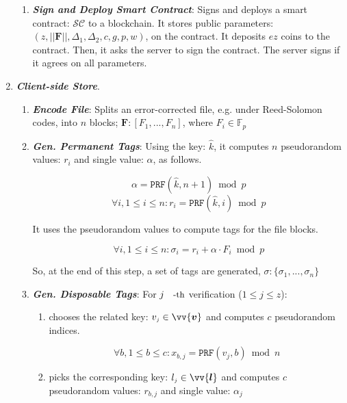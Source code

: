 \begin{enumerate}[leftmargin=.46cm]
\begin{enumerate}
\item\textbf{\textit{\small {Sign and Deploy   Smart Contract}}}: Signs and deploys a smart contract: $\mathcal{SC}$ to a blockchain.  It stores  public parameters: $(z,||{\bm{F}}||, \Delta_{\scriptscriptstyle 1},\Delta_{\scriptscriptstyle 2},c, g,p,w)$, on the contract. It deposits $e z$ coins to the contract. Then, it asks the server to sign the contract. The server signs if it agrees on all parameters.

\end{enumerate}
\item\textit{\textbf{Client-side Store}}.


\begin{enumerate}

\item \textbf{\textit{\small {Encode File}}}: Splits an error-corrected file, e.g. under Reed-Solomon codes, into $n$ blocks; ${\bm{F}}: [F_{\scriptscriptstyle 1},...,F_{\scriptscriptstyle n}]$,  where $ F_{\scriptscriptstyle i}\in \mathbb{F}_p$
\item\label{gen-client-server-tags}\textbf{\textit{\small {Gen. Permanent Tags}}}:  Using the key: $\hat{k}$, it computes $n$ pseudorandom values:  $r_{\scriptscriptstyle i}$ and single value: $\alpha$, as follows.  

 $$\alpha=\mathtt{PRF}(\hat{k},n+1)\bmod p$$
 $$ \forall i, 1\leq i\leq n: r_{\scriptscriptstyle i}=\mathtt{PRF}(\hat{k},i)\bmod p$$

 
 It uses the pseudorandom values to compute tags for the file blocks. 
 
 $$\forall i, 1\leq i\leq n: \sigma_{\scriptscriptstyle i}= r_{\scriptscriptstyle i}+ \alpha\cdot F_{\scriptscriptstyle  i}\bmod p$$
 
  So, at the end of this step,  a set of  tags are generated, $\sigma:\{\sigma_{\scriptscriptstyle 1},..., \sigma_{\scriptscriptstyle n}\}$
\item\label{Gen-Disposable-Tags}\textbf{\textit{\small {Gen. Disposable Tags}}}: For   $j\text{\small{-th}}$ verification  ($1\leq j\leq z$):
\begin{enumerate}
\item chooses the related key: $v_{\scriptscriptstyle j}\in\vv{\bm{v}}$ and computes $c$ pseudorandom indices. 

$$\forall b, 1\leq b\leq c: x_{\scriptscriptstyle b,j}=\mathtt{PRF}(v_{\scriptscriptstyle j}, b)\bmod n$$

\item picks the corresponding  key: $l_{\scriptscriptstyle j}\in \vv{\bm{l}}$ and computes $c$ pseudorandom values:  $r_{\scriptscriptstyle b,j}$ and single value: $\alpha_{\scriptscriptstyle j}$


\end{enumerate}
\end{enumerate}
\end{enumerate}
